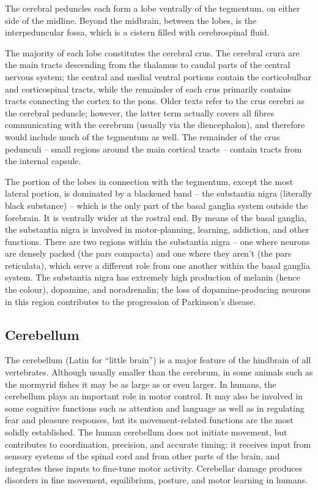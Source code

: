 The cerebral peduncles each form a lobe ventrally of the tegmentum, on either side of the midline. Beyond the midbrain, between the lobes, is the interpeduncular fossa, which is a cistern filled with cerebrospinal fluid.

The majority of each lobe constitutes the cerebral crus. The cerebral crura are the main tracts descending from the thalamus to caudal parts of the central nervous system; the central and medial ventral portions contain the corticobulbar and corticospinal tracts, while the remainder of each crus primarily contains tracts connecting the cortex to the pons. Older texts refer to the crus cerebri as the cerebral peduncle; however, the latter term actually covers all fibres communicating with the cerebrum (usually via the diencephalon), and therefore would include much of the tegmentum as well. The remainder of the crus pedunculi -- small regions around the main cortical tracts -- contain tracts from the internal capsule.

The portion of the lobes in connection with the tegmentum, except the most lateral portion, is dominated by a blackened band -- the substantia nigra (literally black substance) -- which is the only part of the basal ganglia system outside the forebrain. It is ventrally wider at the rostral end. By means of the basal ganglia, the substantia nigra is involved in motor-planning, learning, addiction, and other functions. There are two regions within the substantia nigra -- one where neurons are densely packed (the pars compacta) and one where they aren't (the pars reticulata), which serve a different role from one another within the basal ganglia system. The substantia nigra has extremely high production of melanin (hence the colour), dopamine, and noradrenalin; the loss of dopamine-producing neurons in this region contributes to the progression of Parkinson's disease.

\hypertarget{cerebellum}{%
\subsection{Cerebellum}\label{cerebellum}}

The cerebellum (Latin for ``little brain'') is a major feature of the hindbrain of all vertebrates. Although usually smaller than the cerebrum, in some animals such as the mormyrid fishes it may be as large as or even larger. In humans, the cerebellum plays an important role in motor control. It may also be involved in some cognitive functions such as attention and language as well as in regulating fear and pleasure responses, but its movement-related functions are the most solidly established. The human cerebellum does not initiate movement, but contributes to coordination, precision, and accurate timing: it receives input from sensory systems of the spinal cord and from other parts of the brain, and integrates these inputs to fine-tune motor activity. Cerebellar damage produces disorders in fine movement, equilibrium, posture, and motor learning in humans.

